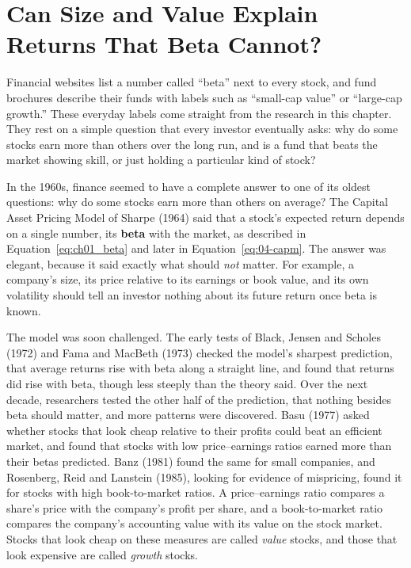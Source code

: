 \makeatletter
{}
\makeatother

\chapter{Can Size and Value Explain Returns That Beta Cannot?}
\label{ch:03}
\providecommand{\term}[1]{\emph{#1}}

Financial websites list a number called ``beta'' next to every stock, and fund brochures describe their funds with labels such as ``small-cap value'' or ``large-cap growth.'' These everyday labels come straight from the research in this chapter. They rest on a simple question that every investor eventually asks: why do some stocks earn more than others over the long run, and is a fund that beats the market showing skill, or just holding a particular kind of stock?

In the 1960s, finance seemed to have a complete answer to one of its oldest questions: why do some stocks earn more than others on average? The Capital Asset Pricing Model of Sharpe (1964) said that a stock's expected return depends on a single number, its \textbf{beta} with the market, as described in Equation~\ref{eq:ch01_beta} and later in Equation~\ref{eq:04-capm}. The answer was elegant, because it said exactly what should \emph{not} matter. For example, a company's size, its price relative to its earnings or book value, and its own volatility should tell an investor nothing about its future return once beta is known.

The model was soon challenged. The early tests of Black, Jensen and Scholes (1972) and Fama and MacBeth (1973) checked the model's sharpest prediction, that average returns rise with beta along a straight line, and found that returns did rise with beta, though less steeply than the theory said. Over the next decade, researchers tested the other half of the prediction, that nothing besides beta should matter, and more patterns were discovered.
Basu (1977) asked whether stocks that look cheap relative to their profits could beat an efficient market, and found that stocks with low price--earnings ratios earned more than their betas predicted. Banz (1981) found the same for small companies, and Rosenberg, Reid and Lanstein (1985), looking for evidence of mispricing, found it for stocks with high book-to-market ratios. A price--earnings ratio compares a share's price with the company's profit per share, and a book-to-market ratio compares the company's accounting value with its value on the stock market. Stocks that look cheap on these measures are called \emph{value} stocks, and those that look expensive are called \emph{growth} stocks.

